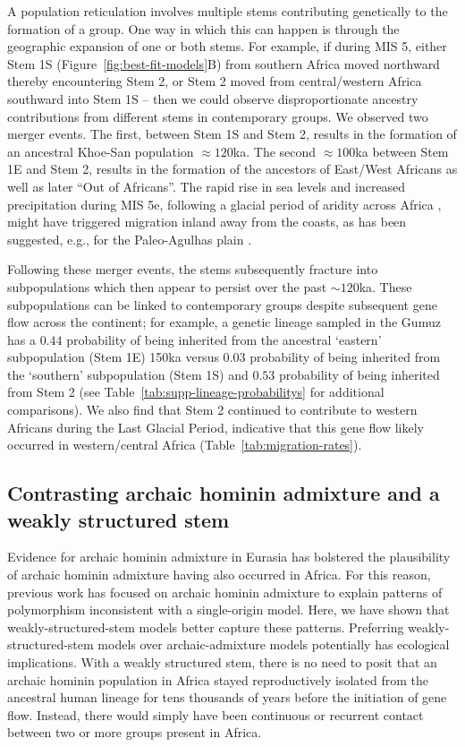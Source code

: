 \documentclass[]{article}
\begin{document}
A population reticulation involves multiple stems contributing genetically to
the formation of a group. One way in which this can happen is through the
geographic expansion of one or both stems. For example, if during MIS 5, either
Stem 1S (Figure~\ref{fig:best-fit-models}B) 
from southern Africa moved northward thereby encountering Stem 2,
or Stem 2 moved from central/western Africa southward into Stem 1S -- then we
could observe disproportionate ancestry contributions from different stems in
contemporary groups. We observed two merger events. The first, between Stem 1S and
Stem 2, results in the formation of an ancestral Khoe-San population $\approx120$ka.
The second $\approx100$ka between Stem 1E and Stem 2, results in the formation of the
ancestors of East/West Africans as well as later ``Out of Africans''. The rapid
rise in sea levels and increased precipitation during MIS 5e, following a
glacial period of aridity across Africa \citep{Blome2012-lw}, might have
triggered migration inland away from the coasts, as has been suggested, e.g., for the
Paleo-Agulhas plain \citep{Marean2014-pg}.


Following these merger events, the stems subsequently fracture into
subpopulations which then appear to persist over the past $\sim120$ka. These
subpopulations can be linked to contemporary groups despite subsequent gene flow
across the continent; for example, a genetic lineage sampled in the Gumuz has a
$0.44$ probability of being inherited from the ancestral ‘eastern’ subpopulation
(Stem 1E) 150ka versus $0.03$ probability of being inherited from the ‘southern’
subpopulation (Stem 1S) and $0.53$ probability of being inherited from Stem 2
(see Table~\ref{tab:supp-lineage-probabilitys} for additional comparisons). We also
find that Stem 2 continued to contribute to western Africans during the Last
Glacial Period, indicative that this gene flow likely occurred in
western/central Africa (Table~\ref{tab:migration-rates}). 



\subsection*{Contrasting archaic hominin admixture and a weakly structured stem}

Evidence for archaic hominin admixture in Eurasia has bolstered the plausibility of 
archaic hominin admixture having also occurred in Africa. For this reason, previous 
work has focused on archaic hominin admixture to explain patterns of polymorphism 
inconsistent with a single-origin model. Here, we have shown that weakly-structured-stem 
models better capture these patterns. Preferring weakly-structured-stem models over 
archaic-admixture models potentially has ecological implications. With a weakly 
structured stem, there is no need to posit that an archaic hominin population in Africa stayed 
reproductively isolated from the ancestral human lineage for tens thousands of years before 
the initiation of gene flow. Instead, there would simply have been continuous or recurrent 
contact between two or more groups present in Africa. 
\end{document}
